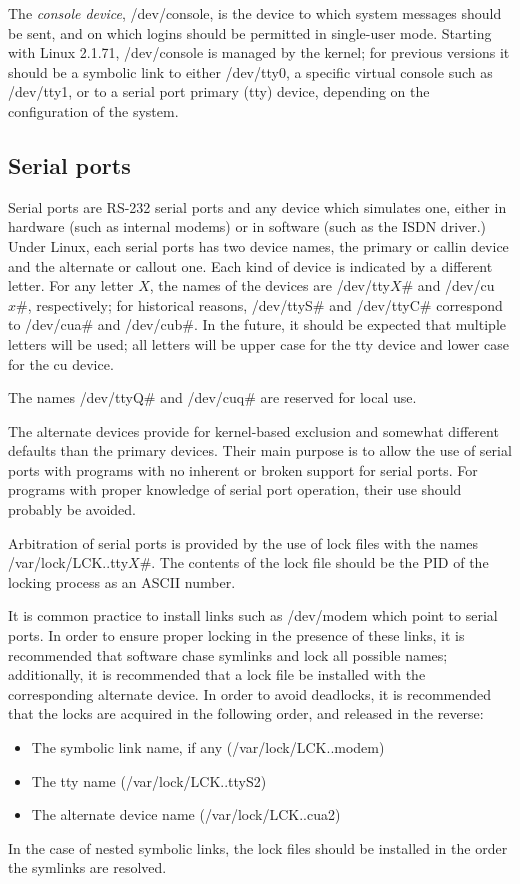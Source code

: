 The {\em console device\/}, {\file /dev/console}, is the device to
which system messages should be sent, and on which logins should be
permitted in single-user mode.  Starting with Linux 2.1.71, {\file
/dev/console} is managed by the kernel; for previous versions it
should be a symbolic link to either {\file /dev/tty0}, a specific
virtual console such as {\file /dev/tty1}, or to a serial port primary
({\file tty}) device, depending on the configuration of the system.

\subsection{Serial ports}

Serial ports are RS-232 serial ports and any device which simulates
one, either in hardware (such as internal modems) or in software (such
as the ISDN driver.)  Under Linux, each serial ports has two device
names, the primary or callin device and the alternate or callout one.
Each kind of device is indicated by a different letter.  For any
letter $X$, the names of the devices are {\file /dev/tty${X\#}$} and
{\file /dev/cu${x\#}$}, respectively; for historical reasons, {\file
/dev/ttyS$\#$} and {\file /dev/ttyC$\#$} correspond to {\file
/dev/cua$\#$} and {\file /dev/cub$\#$}.  In the future, it should be
expected that multiple letters will be used; all letters will be upper
case for the {\file tty} device and lower case for the {\file cu}
device.

The names {\file /dev/ttyQ$\#$} and {\file /dev/cuq$\#$} are reserved
for local use.

The alternate devices provide for kernel-based exclusion and somewhat
different defaults than the primary devices.  Their main purpose is to
allow the use of serial ports with programs with no inherent or broken
support for serial ports.  For programs with proper knowledge of
serial port operation, their use should probably be avoided.

Arbitration of serial ports is provided by the use of lock files with
the names {\file /var/lock/LCK..tty${X\#}$}.  The contents of the lock
file should be the PID of the locking process as an ASCII number.

It is common practice to install links such as {\file /dev/modem\/}
which point to serial ports.  In order to ensure proper locking in the
presence of these links, it is recommended that software chase
symlinks and lock all possible names; additionally, it is recommended
that a lock file be installed with the corresponding alternate
device.  In order to avoid deadlocks, it is recommended that the locks
are acquired in the following order, and released in the reverse:
\begin{itemize}
\item{The symbolic link name, if any ({\file /var/lock/LCK..modem})}
\item{The {\file tty} name ({\file /var/lock/LCK..ttyS2})}
\item{The alternate device name ({\file /var/lock/LCK..cua2})}
\end{itemize}
In the case of nested symbolic links, the lock files should be
installed in the order the symlinks are resolved.

